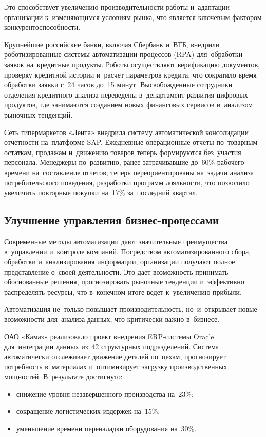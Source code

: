 \documentclass{ou}
\begin{document}
Это способствует увеличению производительности работы и~адаптации организации к~изменяющимся условиям рынка, что является ключевым фактором конкурентоспособности.

Крупнейшие российские банки, включая Сбербанк и~ВТБ, внедрили роботизированные системы автоматизации процессов (RPA) для~обработки заявок на~кредитные продукты. Роботы осуществляют верификацию документов, проверку кредитной истории и~расчет параметров кредита, что сократило время обработки заявки с~24 часов до~15 минут. Высвобожденные сотрудники отделения кредитного анализа переведены в~департамент развития цифровых продуктов, где занимаются созданием новых финансовых сервисов и~анализом рыночных тенденций.

Сеть гипермаркетов «Лента» внедрила систему автоматической консолидации отчетности на~платформе SAP. Ежедневные операционные отчеты по~товарным остаткам, продажам и~движению товаров теперь формируются без~участия персонала. Менеджеры по~развитию, ранее затрачивавшие до~60\% рабочего времени на~составление отчетов, теперь переориентированы на~задачи анализа потребительского поведения, разработки программ лояльности, что позволило увеличить повторные покупки на~17\% за~последний квартал.
\subsection{Улучшение управления бизнес-процессами}
Современные методы автоматизации дают значительные преимущества в~управлении и~контроле компаний. Посредством автоматизированного сбора, обработки и~анализирования информации, организации получают полное представление о~своей деятельности. Это дает возможность принимать обоснованные решения, прогнозировать рыночные тенденции и~эффективно распределять ресурсы, что в~конечном итоге ведет к~увеличению прибыли.

Автоматизация не~только повышает производительность, но~и~открывает новые возможности для~анализа данных, что критически важно в~бизнесе.

ОАО «Камаз»  реализовало проект внедрения ERP-системы Oracle для~интеграции данных из~42 структурных подразделений. Система автоматически отслеживает движение деталей по~цехам, прогнозирует потребность в~материалах и~оптимизирует загрузку производственных мощностей. В~результате достигнуто:

\begin{itemize}[label=-, leftmargin=0em, itemindent=3.35em, nosep]
\item снижение уровня незавершенного производства на~23\%;
\item сокращение логистических издержек на~15\%;
\item уменьшение времени переналадки оборудования на~30\%.
\end{itemize}
\end{document}
